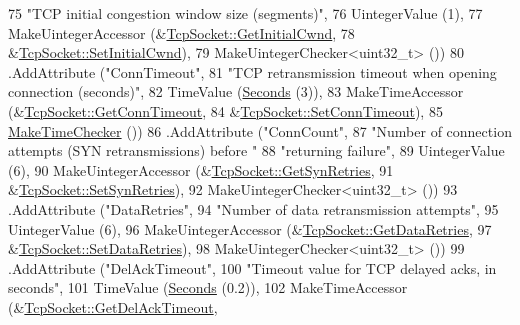 \begin{DoxyCode}
75                    \textcolor{stringliteral}{"TCP initial congestion window size (segments)"},
76                    UintegerValue (1),
77                    MakeUintegerAccessor (&\hyperlink{classns3_1_1TcpSocket_adeb7fef4213315f2c743ab7ac22ec2d3}{TcpSocket::GetInitialCwnd},
78                                          &\hyperlink{classns3_1_1TcpSocket_ae2dbd6d7ffcfc063fc0b84c8b517d74b}{TcpSocket::SetInitialCwnd}),
79                    MakeUintegerChecker<uint32\_t> ())
80     .AddAttribute (\textcolor{stringliteral}{"ConnTimeout"},
81                    \textcolor{stringliteral}{"TCP retransmission timeout when opening connection (seconds)"},
82                    TimeValue (\hyperlink{group__timecivil_ga33c34b816f8ff6628e33d5c8e9713b9e}{Seconds} (3)),
83                    MakeTimeAccessor (&\hyperlink{classns3_1_1TcpSocket_ac1071340de41405b7984fd4174e87bbb}{TcpSocket::GetConnTimeout},
84                                      &\hyperlink{classns3_1_1TcpSocket_acde1dd61f9790c1e4d9faff352d7c4a8}{TcpSocket::SetConnTimeout}),
85                    \hyperlink{group__time_ga7032965bd4afa578691d88c09e4481c1}{MakeTimeChecker} ())
86     .AddAttribute (\textcolor{stringliteral}{"ConnCount"},
87                    \textcolor{stringliteral}{"Number of connection attempts (SYN retransmissions) before "}
88                    \textcolor{stringliteral}{"returning failure"},
89                    UintegerValue (6),
90                    MakeUintegerAccessor (&\hyperlink{classns3_1_1TcpSocket_a80d5ebdbc7400325e1a76ad0c1f93e06}{TcpSocket::GetSynRetries},
91                                          &\hyperlink{classns3_1_1TcpSocket_af2f2e8f1d0cd533e5dde58ef68c1774a}{TcpSocket::SetSynRetries}),
92                    MakeUintegerChecker<uint32\_t> ())
93     .AddAttribute (\textcolor{stringliteral}{"DataRetries"},
94                    \textcolor{stringliteral}{"Number of data retransmission attempts"},
95                    UintegerValue (6),
96                    MakeUintegerAccessor (&\hyperlink{classns3_1_1TcpSocket_a405c339d8ed65ddfac6cd99827a1f019}{TcpSocket::GetDataRetries},
97                                          &\hyperlink{classns3_1_1TcpSocket_ac56c8dc614fc35836105b6bb9351e021}{TcpSocket::SetDataRetries}),
98                    MakeUintegerChecker<uint32\_t> ())
99     .AddAttribute (\textcolor{stringliteral}{"DelAckTimeout"},
100                    \textcolor{stringliteral}{"Timeout value for TCP delayed acks, in seconds"},
101                    TimeValue (\hyperlink{group__timecivil_ga33c34b816f8ff6628e33d5c8e9713b9e}{Seconds} (0.2)),
102                    MakeTimeAccessor (&\hyperlink{classns3_1_1TcpSocket_ad2f42e0b4f6bfa6fde17c4e94a176ccc}{TcpSocket::GetDelAckTimeout},

\end{DoxyCode}

